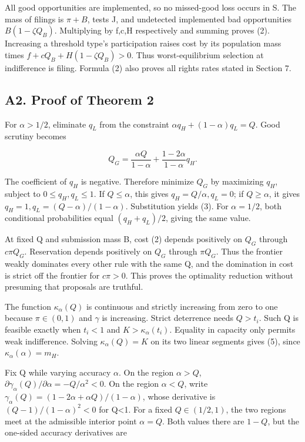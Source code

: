 \documentclass[
  11pt,
]{article}
\begin{document}
All good opportunities are implemented, so no missed-good loss occurs in
S. The mass of filings is \(\pi+B\), tests J, and undetected implemented
bad opportunities \(B(1-\zeta Q_B)\). Multiplying by f,c,H respectively
and summing proves (2). Increasing a threshold type's participation
raises cost by its population mass times \(f+cQ_B+H(1-\zeta Q_B)>0\).
Thus worst-equilibrium selection at indifference is filing. Formula (2)
also proves all rights rates stated in Section 7.

\subsection{A2. Proof of Theorem 2}\label{a2.-proof-of-theorem-2}

For \(\alpha>1/2\), eliminate \(q_L\) from the constraint
\(\alpha q_H+(1-\alpha)q_L=Q\). Good scrutiny becomes

\[Q_G=\frac{\alpha Q}{1-\alpha}+\frac{1-2\alpha}{1-\alpha}q_H.\]

The coefficient of \(q_H\) is negative. Therefore minimize \(Q_G\) by
maximizing \(q_H\), subject to \(0\leq q_H,q_L\leq1\). If
\(Q\leq\alpha\), this gives \(q_H=Q/\alpha,q_L=0\); if \(Q\geq\alpha\),
it gives \(q_H=1,q_L=(Q-\alpha)/(1-\alpha)\). Substitution yields (3).
For \(\alpha=1/2\), both conditional probabilities equal
\((q_H+q_L)/2\), giving the same value.

At fixed Q and submission mass B, cost (2) depends positively on \(Q_G\)
through \(c\pi Q_G\). Reservation depends positively on \(Q_G\) through
\(\pi Q_G\). Thus the frontier weakly dominates every other rule with
the same Q, and the domination in cost is strict off the frontier for
\(c\pi>0\). This proves the optimality reduction without presuming that
proposals are truthful.

The function \(\kappa_\alpha(Q)\) is continuous and strictly increasing
from zero to one because \(\pi\in(0,1)\) and \(\gamma\) is increasing.
Strict deterrence needs \(Q>t_i\). Such Q is feasible exactly when
\(t_i<1\) and \(K>\kappa_\alpha(t_i)\). Equality in capacity only
permits weak indifference. Solving \(\kappa_\alpha(Q)=K\) on its two
linear segments gives (5), since \(\kappa_\alpha(\alpha)=m_H\).

Fix Q while varying accuracy \(\alpha\). On the region \(\alpha>Q\),
\(\partial\gamma_\alpha(Q)/\partial\alpha=-Q/\alpha^2<0\). On the region
\(\alpha<Q\), write
\(\gamma_\alpha(Q)=(1-2\alpha+\alpha Q)/(1-\alpha)\), whose derivative
is \((Q-1)/(1-\alpha)^2<0\) for Q\textless1. For a fixed
\(Q\in(1/2,1)\), the two regions meet at the admissible interior point
\(\alpha=Q\). Both values there are \(1-Q\), but the one-sided accuracy
derivatives are
\end{document}

